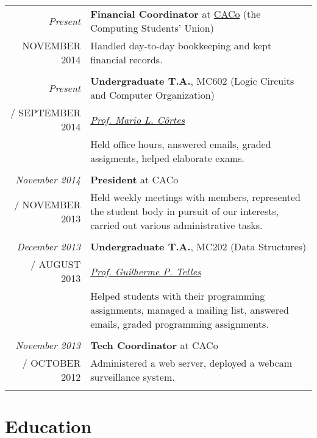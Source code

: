 \documentclass[a4paper,10pt]{article}
\makeatletter
\def\fakesc#1{%
  \begingroup%
  \xdef\fake@name{\csname\curr@fontshape/\f@size\endcsname}%
  \fontsize{\fontdimen8\fake@name}{\baselineskip}\selectfont%
  \uppercase{#1}%
  \endgroup%
}
\renewcommand{\textsc}{\fakesc}
\makeatother
\begin{document}
\begin{tabular}{r|p{11cm}}

  \emph{Present} & \textbf{Financial Coordinator} at \href{http://www.caco.ic.unicamp.br}{CACo} (the Computing Students' Union) \\
  \textsc{November 2014} & \footnotesize{Handled day-to-day bookkeeping and kept financial records.}\\
  \multicolumn{2}{c}{} \\

  \emph{Present} & \textbf{Undergraduate T.A.}, MC602 (Logic Circuits and Computer Organization)\\
  \textsc{September 2014} &  \href{http://www.ic.unicamp.br/~cortes/}{\emph{Prof. Mario L. Côrtes}}\\
                 & \footnotesize {Held office hours, answered emails, graded assigments, helped elaborate exams.}\\
  \multicolumn{2}{c}{}\\

  \emph{November 2014} & \textbf{President} at CACo \\
  \textsc{November 2013} & \footnotesize{Held weekly meetings with members, represented the student body in pursuit of our interests, carried out various administrative tasks.}\\
  \multicolumn{2}{c}{} \\

  \emph{December 2013} & \textbf{Undergraduate T.A.},  MC202 (Data Structures)\\
  \textsc{August 2013} &  \href{http://ic.unicamp.br/~gpt/}{\emph{Prof. Guilherme P. Telles}}\\
                 & \footnotesize {Helped students with their programming assignments, managed a mailing list, answered emails, graded programming assignments.}\\
  \multicolumn{2}{c}{}\\

  \emph{November 2013} & \textbf{Tech Coordinator} at CACo \\
  \textsc{October 2012} & \footnotesize{Administered a web server, deployed a webcam surveillance system.}\\
  \multicolumn{2}{c}{} \\


\end{tabular}

\section{Education}
\end{document}
